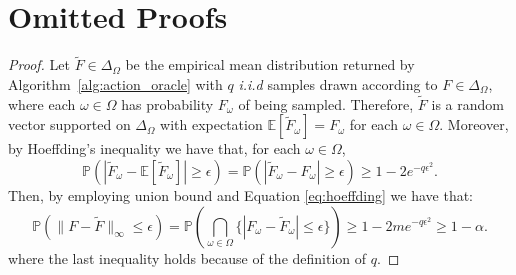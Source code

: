 \section{Omitted Proofs}
\begin{proof}
Let $\widetilde{F} \in \Delta_\Omega$ be the empirical mean distribution returned by Algorithm~\ref{alg:action_oracle} with $q$ \emph{i.i.d} samples drawn according to $F \in \Delta_\Omega$, where each $\omega \in \Omega$
has probability $F_\omega$ of being sampled. Therefore, $\widetilde{F}$ is a random vector supported on $\Delta_\Omega$ 
with expectation $\mathbb{E}[\widetilde{F}_\omega]=F_\omega$ for each $\omega \in \Omega$. Moreover, by Hoeffding’s inequality we have that, for each $\omega \in \Omega$,
\begin{equation}\label{eq:hoeffding}
\mathbb{P}\left(|\widetilde{F}_\omega-\mathbb{E}\left[\widetilde{F}_\omega\right]| \ge \epsilon\right) =\mathbb{P}\left(|\widetilde{F}_\omega-F_\omega| \ge \epsilon\right) \ge 1- 2e^{-q\epsilon^2}.
\end{equation}
Then, by employing union bound and Equation \ref{eq:hoeffding} we have that:
\begin{equation*}
\mathbb{P}\left( \|F-\widetilde{F}\|_{\infty} \le \epsilon \right) = \mathbb{P}\left(\bigcap_{\omega \in \Omega }\{ |F_\omega-\widetilde{F}_\omega| \le \epsilon \}\right) \ge 1 - 2 m e^{-q\epsilon^2} \ge 1-\alpha.
\end{equation*}
where the last inequality holds because of the definition of $q$.
\end{proof}

